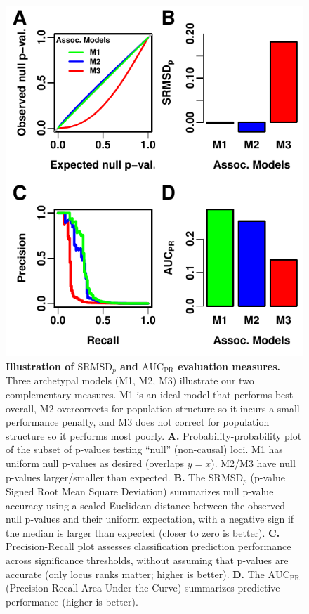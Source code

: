 \documentclass[11pt]{article}
\newcommand{\rmsd}{\text{SRMSD}_p}
\newcommand{\auc}{\text{AUC}_\text{PR}}
\begin{document}
\begin{figure}[bp!]
  \centering
  \includegraphics{sim-n1000-k10-f0.1-s0.5-g1/measures-illustration.pdf}
  \caption{
    {\bf Illustration of $\rmsd$ and $\auc$ evaluation measures.}
    Three archetypal models (M1, M2, M3) illustrate our two complementary measures.
    M1 is an ideal model that performs best overall, M2 overcorrects for population structure so it incurs a small performance penalty, and M3 does not correct for population structure so it performs most poorly.
    \textbf{A.}
    Probability-probability plot of the subset of p-values testing ``null'' (non-causal) loci.
    M1 has uniform null p-values as desired (overlaps $y=x$).
    M2/M3 have null p-values larger/smaller than expected.
    \textbf{B.}
    The $\rmsd$ (p-value Signed Root Mean Square Deviation) summarizes null p-value accuracy using a scaled Euclidean distance between the observed null p-values and their uniform expectation, with a negative sign if the median is larger than expected (closer to zero is better).
    \textbf{C.}
    Precision-Recall plot assesses classification prediction performance across significance thresholds, without assuming that p-values are accurate (only locus ranks matter; higher is better).
    \textbf{D.}
    The $\auc$ (Precision-Recall Area Under the Curve) summarizes predictive performance (higher is better).
  }
  \label{fig:measures_illustration}
\end{figure}
\end{document}
